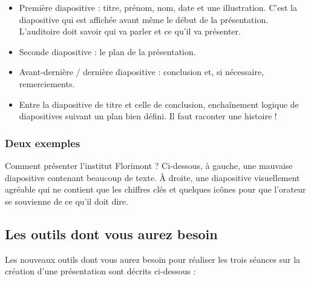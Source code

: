 \begin{itemize}
\item Première diapositive : titre, prénom, nom, date et une illustration. C'est la diapositive qui est affichée avant même le début de la présentation. L'auditoire doit savoir qui va parler et ce qu'il va présenter.
\item Seconde diapositive : le plan de la présentation.
\item Avant-dernière / dernière diapositive : conclusion et, si nécessaire, remerciements.
\item Entre la diapositive de titre et celle de conclusion, enchaînement logique de diapositives suivant un plan bien défini. Il faut raconter une histoire !
\end{itemize}

\subsubsection{Deux exemples}

Comment présenter l'institut Florimont ? Ci-dessous, à gauche, une mauvaise diapositive contenant beaucoup de texte. À droite, une diapositive visuellement agréable qui ne contient que les chiffres clés et quelques icônes pour que l'orateur se souvienne de ce qu'il doit dire.




\subsection{Les outils dont vous aurez besoin}\label{Presentation6eOutils}

Les nouveaux outils dont vous aurez besoin pour réaliser les trois séances sur la création d'une présentation sont décrits ci-dessous :


